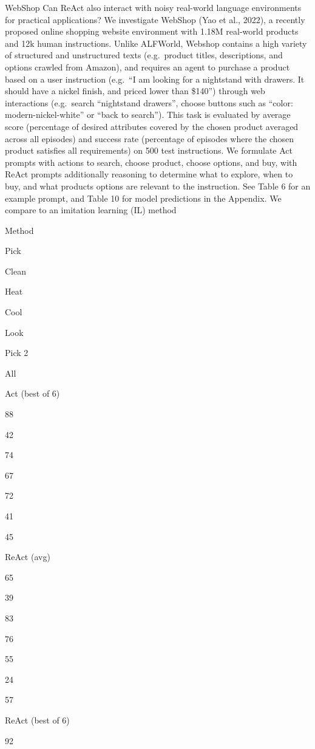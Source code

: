 \documentclass[
]{article}
\begin{document}
WebShop Can ReAct also interact with noisy real-world language
environments for practical applications? We investigate WebShop (Yao et
al., 2022), a recently proposed online shopping website environment with
1.18M real-world products and 12k human instructions. Unlike ALFWorld,
Webshop contains a high variety of structured and unstructured texts
(e.g.~product titles, descriptions, and options crawled from Amazon),
and requires an agent to purchase a product based on a user instruction
(e.g.~``I am looking for a nightstand with drawers. It should have a
nickel finish, and priced lower than \$140'') through web interactions
(e.g.~search ``nightstand drawers'', choose buttons such as ``color:
modern-nickel-white'' or ``back to search''). This task is evaluated by
average score (percentage of desired attributes covered by the chosen
product averaged across all episodes) and success rate (percentage of
episodes where the chosen product satisfies all requirements) on 500
test instructions. We formulate Act prompts with actions to search,
choose product, choose options, and buy, with ReAct prompts additionally
reasoning to determine what to explore, when to buy, and what products
options are relevant to the instruction. See Table 6 for an example
prompt, and Table 10 for model predictions in the Appendix. We compare
to an imitation learning (IL) method

Method

Pick

Clean

Heat

Cool

Look

Pick 2

All

Act (best of 6)

88

42

74

67

72

41

45

ReAct (avg)

65

39

83

76

55

24

57

ReAct (best of 6)

92
\end{document}
